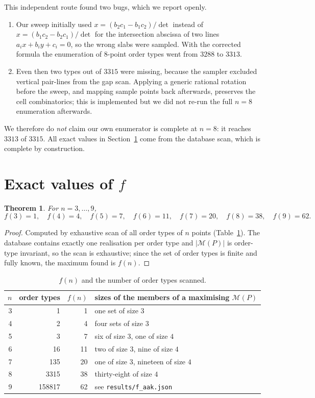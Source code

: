 \documentclass[11pt,a4paper]{article}
\newtheorem{theorem}{Theorem}[section]
\theoremstyle{definition}
\newcommand{\M}{\mathcal{M}}
\begin{document}
This independent route found two bugs, which we report openly.

\begin{enumerate}[leftmargin=*]
\item Our sweep initially used $x=(b_2c_1-b_1c_2)/\det$ instead of
  $x=(b_1c_2-b_2c_1)/\det$ for the intersection abscissa of two lines
  $a_ix+b_iy+c_i=0$, so the wrong slabs were sampled.  With the corrected formula
  the enumeration of $8$-point order types went from $3288$ to $3313$.
\item Even then two types out of $3315$ were missing, because the sampler excluded
  vertical pair-lines from the gap scan.  Applying a generic rational rotation
  before the sweep, and mapping sample points back afterwards, preserves the cell
  combinatorics; this is implemented but we did not re-run the full $n=8$
  enumeration afterwards.
\end{enumerate}

We therefore do \emph{not} claim our own enumerator is complete at $n=8$: it
reaches $3313$ of $3315$.  All exact values in Section~\ref{sec:values} come from
the database scan, which is complete by construction.

\section{Exact values of $f$}
\label{sec:values}

\begin{theorem}
\label{thm:f}
For $n=3,\dots,9$,
\[
  f(3)=1,\quad f(4)=4,\quad f(5)=7,\quad f(6)=11,\quad
  f(7)=20,\quad f(8)=38,\quad f(9)=62.
\]
\end{theorem}

\begin{proof}
Computed by exhaustive scan of all order types of $n$ points (Table~\ref{tab:f}).
The database contains exactly one realisation per order type and $|\M(P)|$ is
order-type invariant, so the scan is exhaustive; since the set of order types is
finite and fully known, the maximum found is $f(n)$.
\end{proof}

\begin{table}[ht]
\centering
\caption{$f(n)$ and the number of order types scanned.}
\label{tab:f}
\begin{tabular}{r r r l}
\toprule
$n$ & order types & $f(n)$ & sizes of the members of a maximising $\M(P)$ \\
\midrule
3 & 1       & 1  & one set of size $3$ \\
4 & 2       & 4  & four sets of size $3$ \\
5 & 3       & 7  & six of size $3$, one of size $4$ \\
6 & 16      & 11 & two of size $3$, nine of size $4$ \\
7 & 135     & 20 & one of size $3$, nineteen of size $4$ \\
8 & 3315    & 38 & thirty-eight of size $4$ \\
9 & 158817  & 62 & see \texttt{results/f\_aak.json} \\
\bottomrule
\end{tabular}
\end{table}
\end{document}
